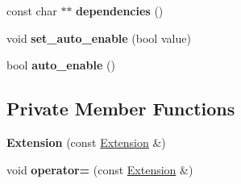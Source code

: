 \begin{DoxyCompactItemize}
\item 
const char $\ast$$\ast$ {\bfseries dependencies} ()\hypertarget{classv8_1_1_extension_adbec8a811d5a4554678da4a5d55dda6d}{}\label{classv8_1_1_extension_adbec8a811d5a4554678da4a5d55dda6d}

\item 
void {\bfseries set\+\_\+auto\+\_\+enable} (bool value)\hypertarget{classv8_1_1_extension_af5b752ba211315b6e9dac5c0e6e638e8}{}\label{classv8_1_1_extension_af5b752ba211315b6e9dac5c0e6e638e8}

\item 
bool {\bfseries auto\+\_\+enable} ()\hypertarget{classv8_1_1_extension_aee87ef4f9c3d7880fc3b28765d28e516}{}\label{classv8_1_1_extension_aee87ef4f9c3d7880fc3b28765d28e516}

\end{DoxyCompactItemize}
\subsection*{Private Member Functions}
\begin{DoxyCompactItemize}
\item 
{\bfseries Extension} (const \hyperlink{classv8_1_1_extension}{Extension} \&)\hypertarget{classv8_1_1_extension_a27b882e3455c86303822c8012420a5b2}{}\label{classv8_1_1_extension_a27b882e3455c86303822c8012420a5b2}

\item 
void {\bfseries operator=} (const \hyperlink{classv8_1_1_extension}{Extension} \&)\hypertarget{classv8_1_1_extension_a648d5a0b99a45a0b0554301ab697e81c}{}\label{classv8_1_1_extension_a648d5a0b99a45a0b0554301ab697e81c}

\end{DoxyCompactItemize}
